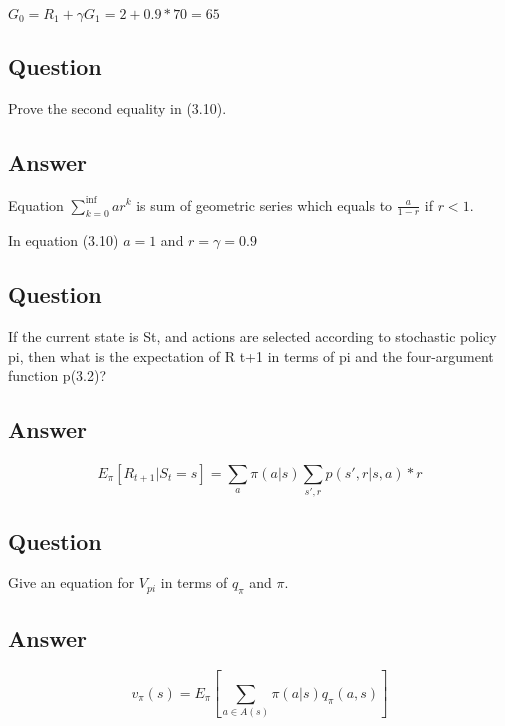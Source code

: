 \documentclass[11pt]{article}
\begin{document}
    $G_0 = R_{1} + \gamma G_{1} = 2 + 0.9 * 70 = 65 $

    \subsection{Question}

    Prove the second equality in (3.10).

    \subsection*{Answer}

    Equation $\sum_{k=0}^{\inf}ar^k$ is sum of geometric series which equals to $\frac{a}{1-r}$ if $r<1$.

    In equation (3.10) $a=1$ and $r = \gamma = 0.9$

    \subsection{Question}

    If the current state is St, and actions are selected according to stochastic policy pi, then what is the expectation of R t+1 in terms of pi and the four-argument function p(3.2)?

    \subsection*{Answer}

    \begin{equation}
        E_{\pi}[R_{t+1}|S_{t}=s] = \sum_{a}^{} \pi(a|s) \sum_{s', r}^{} p(s',r|s, a) * r
    \end{equation}

    \subsection{Question}

    Give an equation for $V_{pi}$ in terms of $q_\pi$ and $\pi$.

        \subsection*{Answer}

    \begin{equation}
        v_{\pi}(s) = E_{\pi}[\sum_{a \in A(s)}^{} \pi(a|s)q_{\pi}(a,s)]
    \end{equation}
\end{document}
